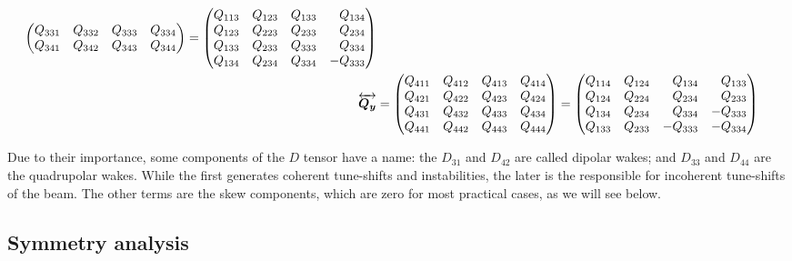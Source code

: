 \begin{align}
\begin{pmatrix*}[r]
                                   Q_{331} & Q_{332} & Q_{333} & Q_{334} \\
                                   Q_{341} & Q_{342} & Q_{343} & Q_{344}
               \end{pmatrix*} =
               \begin{pmatrix*}[r] Q_{113} & Q_{123} & Q_{133} & Q_{134} \\
                                   Q_{123} & Q_{223} & Q_{233} & Q_{234} \\
                                   Q_{133} & Q_{233} & Q_{333} & Q_{334} \\
                                   Q_{134} & Q_{234} & Q_{334} & -Q_{333}
               \end{pmatrix*}\\
\tensor{Q_y}&= \begin{pmatrix*}[r] Q_{411} & Q_{412} & Q_{413} & Q_{414} \\
                                   Q_{421} & Q_{422} & Q_{423} & Q_{424} \\
                                   Q_{431} & Q_{432} & Q_{433} & Q_{434} \\
                                   Q_{441} & Q_{442} & Q_{443} & Q_{444}
               \end{pmatrix*} =
               \begin{pmatrix*}[r] Q_{114} & Q_{124} & Q_{134} & Q_{133} \\
                                   Q_{124} & Q_{224} & Q_{234} & Q_{233} \\
                                   Q_{134} & Q_{234} & Q_{334} & -Q_{333} \\
                                   Q_{133} & Q_{233} &-Q_{333} & -Q_{334}
               \end{pmatrix*}\\
\end{align}



Due to their importance, some components of the $D$ tensor have a name: the $D_{31}$ and $D_{42}$ are called dipolar wakes; and $D_{33}$ and $D_{44}$ are the quadrupolar wakes. While the first generates coherent tune-shifts and instabilities, the later is the responsible for incoherent tune-shifts of the beam. The other terms are the skew components, which are zero for most practical cases, as we will see below.

\subsection{Symmetry analysis}

